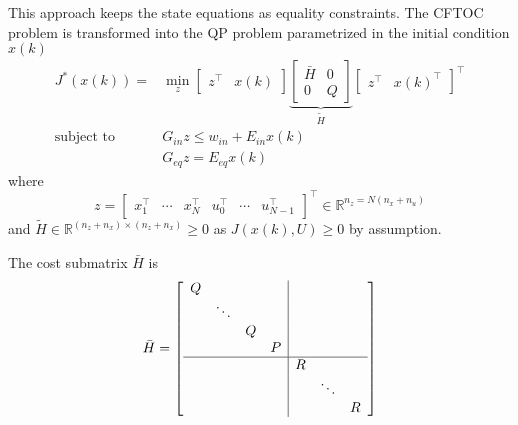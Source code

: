 This approach keeps the state equations as equality constraints. The CFTOC problem is transformed into the QP problem parametrized in the initial condition $x(k)$
\begin{align*}
    J^*(x(k)) =            & \min_{z}\begin{bmatrix}
                                         z^\top & x(k)
                                     \end{bmatrix}
    \underbrace{\begin{bmatrix}
                        \bar{H} & 0 \\
                        0       & Q
                    \end{bmatrix}}_{\tilde{H}}
    \begin{bmatrix}
        z^\top & {x(k)}^\top
    \end{bmatrix}^\top                                       \\
    \text{subject to}\quad & G_{in} z \leq w_{in} +E_{in} x(k) \\
                           & G_{eq} z = E_{eq} x(k)
\end{align*}
where
\begin{equation*}
    z = \begin{bmatrix}
        x_1^\top & \cdots & x_N^\top & u_0^\top & \cdots & u_{N-1}^\top
    \end{bmatrix}^\top \in \mathbb{R}^{n_z = N(n_x + n_u)}
\end{equation*}
and $\tilde{H}\in \mathbb{R}^{(n_z+n_x) \times (n_z+n_x)} \geq 0$ as $J(x(k),U) \geq 0$ by assumption. %

\newpar{}

The cost submatrix $\bar{H}$ is
\begin{equation*}
    \bar{H} = \left[
        \begin{array}{cccc|cccc} %
            Q &        &   &   &   &        &   \\
              & \ddots &   &   &   &        &   \\
              &        & Q &   &   &        &   \\
              &        &   & P &   &        &   \\
            \hline %
              &        &   &   & R &        &   \\
              &        &   &   &   & \ddots &   \\
              &        &   &   &   &        & R
        \end{array}
        \right]
\end{equation*}


